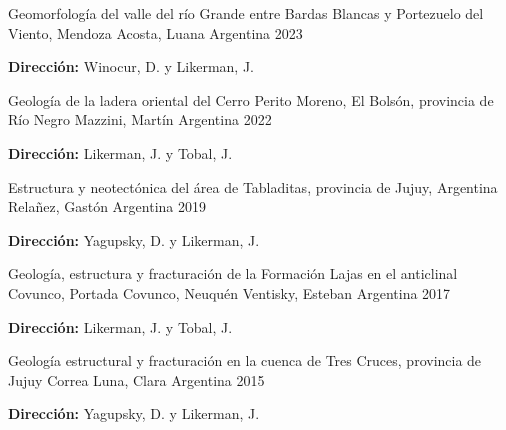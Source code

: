 \begin{cventries}
  \cventry
    {Geomorfología del valle del río Grande entre Bardas Blancas y Portezuelo del Viento, Mendoza}
    {Acosta, Luana}
    {Argentina} %
    {2023} %
    {
      \begin{cvitems} %
        \item {\textbf{Dirección:} Winocur, D. y Likerman, J.}
      \end{cvitems}
    }

  \cventry
     {Geología de la ladera oriental del Cerro Perito Moreno, El Bolsón, provincia de Río Negro}
    {Mazzini, Martín} %
    {Argentina} %
    {2022} %
    {
      \begin{cvitems} %
        \item {\textbf{Dirección:} Likerman, J. y Tobal, J.}
      \end{cvitems}
    }


  \cventry
     {Estructura y neotectónica del área de Tabladitas, provincia de Jujuy, Argentina}
    {Relañez, Gastón} %
    {Argentina} %
    {2019} %
    {
      \begin{cvitems} %
        \item {\textbf{Dirección:} Yagupsky, D. y Likerman, J.}
      \end{cvitems}
    }


  \cventry
     {Geología, estructura y fracturación de la Formación Lajas en el anticlinal Covunco, Portada Covunco, Neuquén}
    {Ventisky, Esteban} %
    {Argentina} %
    {2017} %
    {
      \begin{cvitems} %
        \item {\textbf{Dirección:} Likerman, J. y Tobal, J.}
      \end{cvitems}
    }


  \cventry
     {Geología estructural y fracturación en la cuenca de Tres Cruces, provincia de Jujuy}
    {Correa Luna, Clara} %
    {Argentina} %
    {2015} %
    {
      \begin{cvitems} %
        \item {\textbf{Dirección:} Yagupsky, D. y Likerman, J.}
      \end{cvitems}
    }


\end{cventries}
